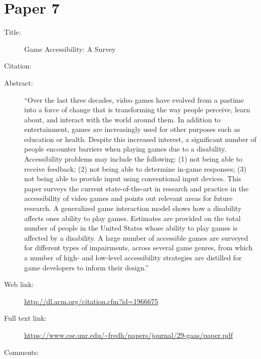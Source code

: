 \documentclass{scrartcl}
\begin{document}
\section*{Paper 7}
\begin{description}
\item[Title:] Game Accessibility: A Survey
\item[Citation:] \cite{Yuan}
\item[Abstract:] ``Over the last three decades, video games have evolved from a pastime into a force of change that is transforming the way people perceive, learn about, and interact with the world around them. In addition to entertainment, games are increasingly used for other purposes such as education or health. Despite this increased interest, a significant number of people encounter barriers when playing games due to a disability. Accessibility problems may include the following: (1) not being able to receive feedback; (2) not being able to determine in-game responses; (3) not being able to provide input using conventional input devices. This paper surveys the current state-of-the-art in research and practice in the accessibility of video games and points out relevant areas for future research. A generalized game interaction model shows how a disability affects ones ability to play games. Estimates are provided on the total number of people in the United States whose ability to play games is affected by a disability. A large number of accessible games are surveyed for different types of impairments, across several game genres, from which a number of high- and low-level accessibility strategies are distilled for game developers to inform their design.''
\item[Web link:] \url {http://dl.acm.org/citation.cfm?id=1966675}
\item[Full text link:] \url {https://www.cse.unr.edu/~fredh/papers/journal/29-gaas/paper.pdf}
\item[Comments:]
\end{description}
\end{document}
